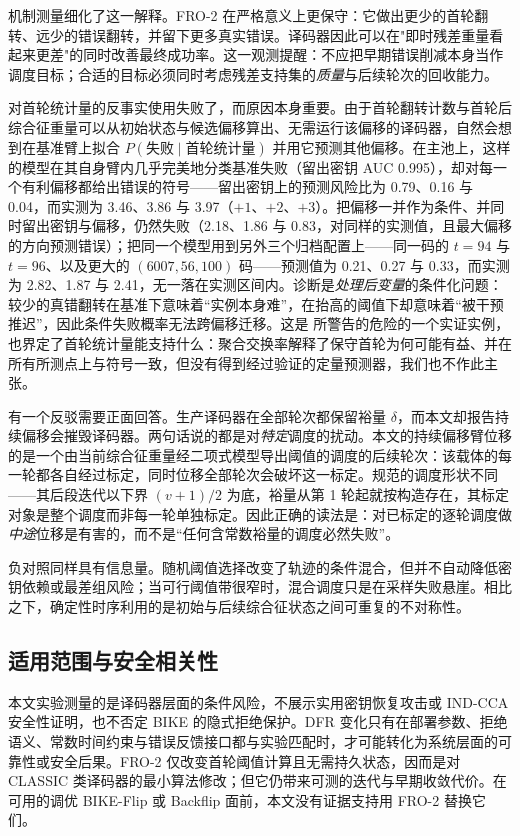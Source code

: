 \documentclass[UTF8,a4paper,10pt,twocolumn]{ctexart}
\begin{document}
机制测量细化了这一解释。FRO-2 在严格意义上更保守：它做出更少的首轮翻转、远少的错误翻转，并留下更多真实错误。译码器因此可以在"即时残差重量看起来更差"的同时改善最终成功率。这一观测提醒：不应把早期错误削减本身当作调度目标；合适的目标必须同时考虑残差支持集的\emph{质量}与后续轮次的回收能力。

对首轮统计量的反事实使用失败了，而原因本身重要。由于首轮翻转计数与首轮后综合征重量可以从初始状态与候选偏移算出、无需运行该偏移的译码器，自然会想到在基准臂上拟合 $P(\text{失败}\mid\text{首轮统计量})$ 并用它预测其他偏移。在主池上，这样的模型在其自身臂内几乎完美地分类基准失败（留出密钥 AUC 0.995），却对每一个有利偏移都给出错误的符号——留出密钥上的预测风险比为 0.79、0.16 与 0.04，而实测为 3.46、3.86 与 3.97（$+1$、$+2$、$+3$）。把偏移一并作为条件、并同时留出密钥与偏移，仍然失败（2.18、1.86 与 0.83，对同样的实测值，且最大偏移的方向预测错误）；把同一个模型用到另外三个归档配置上——同一码的 $t=94$ 与 $t=96$、以及更大的 $(6007,56,100)$ 码——预测值为 0.21、0.27 与 0.33，而实测为 2.82、1.87 与 2.41，无一落在实测区间内。诊断是\emph{处理后变量}的条件化问题：较少的真错翻转在基准下意味着“实例本身难”，在抬高的阈值下却意味着“被干预推迟”，因此条件失败概率无法跨偏移迁移。这是 \cite{annechini2025closedform} 所警告的危险的一个实证实例，也界定了首轮统计量能支持什么：聚合交换率解释了保守首轮为何可能有益、并在所有所测点上与符号一致，但没有得到经过验证的定量预测器，我们也不作此主张。

有一个反驳需要正面回答。生产译码器在全部轮次都保留裕量 $\delta$，而本文却报告持续偏移会摧毁译码器。两句话说的都是对\emph{特定}调度的扰动。本文的持续偏移臂位移的是一个由当前综合征重量经二项式模型导出阈值的调度的后续轮次：该载体的每一轮都各自经过标定，同时位移全部轮次会破坏这一标定。规范的调度形状不同——其后段迭代以下界 $(v{+}1)/2$ 为底，裕量从第 1 轮起就按构造存在，其标定对象是整个调度而非每一轮单独标定。因此正确的读法是：对已标定的逐轮调度做\emph{中途}位移是有害的，而不是“任何含常数裕量的调度必然失败”。

负对照同样具有信息量。随机阈值选择改变了轨迹的条件混合，但并不自动降低密钥依赖或最差组风险；当可行阈值带很窄时，混合调度只是在采样失败悬崖。相比之下，确定性时序利用的是初始与后续综合征状态之间可重复的不对称性。

\subsection{适用范围与安全相关性}

本文实验测量的是译码器层面的条件风险，不展示实用密钥恢复攻击或 IND-CCA 安全性证明，也不否定 BIKE 的隐式拒绝保护。DFR 变化只有在部署参数、拒绝语义、常数时间约束与错误反馈接口都与实验匹配时，才可能转化为系统层面的可靠性或安全后果。FRO-2 仅改变首轮阈值计算且无需持久状态，因而是对 CLASSIC 类译码器的最小算法修改；但它仍带来可测的迭代与早期收敛代价。在可用的调优 BIKE-Flip 或 Backflip 面前，本文没有证据支持用 FRO-2 替换它们。
\end{document}

